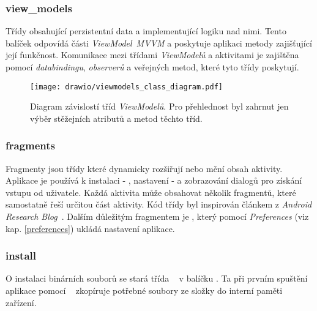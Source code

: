     \subsubsection{view\_models}
    Třídy obsahující perzistentní data a implementující logiku nad nimi. Tento balíček odpovídá části \emph{ViewModel}~\emph{MVVM} a poskytuje aplikaci metody zajišťující její funkčnost. Komunikace mezi třídami \emph{ViewModelů} a aktivitami je zajištěna pomocí \emph{databindingu}, \emph{observerů} a veřejných metod, které tyto třídy poskytují.

    \begin{figure}[h]
        \centering
        \vspace{0.5cm}
        \texttt{[image: drawio/viewmodels\_class\_diagram.pdf]}
        \caption[Diagram závislostí tříd ViewModelů]{Diagram závislostí tříd \emph{ViewModelů}. Pro přehlednost byl zahrnut jen výběr stěžejních atributů a metod těchto tříd.}
        \label{diagram:view_models}
    \end{figure}

    \newpage
    \subsubsection{fragments}
    Fragmenty jsou třídy které dynamicky rozšiřují nebo mění obsah aktivity. Aplikace je používá k instalaci - , nastavení -  a zobrazování dialogů pro získání vstupu od uživatele. Každá aktivita může obsahovat několik fragmentů, které samostatně řeší určitou část aktivity. Kód třídy  byl inspirován článkem z \emph{Android Research Blog}~. Dalším důležitým fragmentem je , který pomocí \emph{Preferences} (viz kap. \ref{preferences}) ukládá nastavení aplikace.

    \subsubsection{install}
    O instalaci binárních souborů se stará třída ~ v balíčku . Ta při prvním spuštění aplikace pomocí ~ zkopíruje potřebné soubory ze složky  do interní paměti zařízení.

